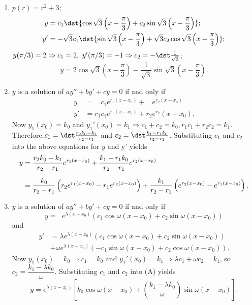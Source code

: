 \documentclass[openany]{book}
\newenvironment{sectionSolutions}{
 \begin{enumerate}[item-label={\thesection.\arabic{enumi}.}]
}{
 \end{enumerate}
}
\begin{document}
\begin{sectionSolutions}
\item
$p(r)=r^2+3$;
\begin{align*}
y&=c_1\dst{\cos \sqrt3\left(x-\frac{\pi}{3}\right)+c_2\sin
\sqrt3\left(x-\frac{\pi}{3}\right)};\\
y'&=-\sqrt3c_1\dst{\sin
\sqrt3\left(x-\frac{\pi}{3}\right)+\sqrt3c_2\cos
\sqrt3\left(x-\frac{\pi}{3}\right)};
\end{align*}
$y(\pi/3)=2\Rightarrow c_1=2,\ y'(\pi/3)=-1\Rightarrow
c_2=-\dst\frac{1}{\sqrt3}$;\;
\[
y=2\cos \sqrt3\left(x-\frac{\pi}{3}\right)-\frac{1}{\sqrt3}\sin
\sqrt3\left(x-\frac{\pi}{3}\right).
\]


\item
$y$ is a solution of $ay''+by'+cy=0$  if and only if
\begin{align*}
y&=\phantom{r_1}c_1e^{r_1(x-x_0)}+\phantom{r_2}e^{r_2(x-x_0)}\\
y'&=r_1c_1e^{r_1(x-x_0)}+r_2e^{r_2}(x-x_0).
\end{align*}
Now $y_1(x_0)=k_0$ and $y_1'(x_0)=k_1\Rightarrow c_1+c_2=k_0,
r_1c_1+r_2c_2=k_1$. Therefore,$c_1=\dst\frac{r_2k_0-k_1}{ r_2-r_1}$
and $c_2=\dst\frac{k_1-r_1k_0}{ r_2-r_1}$. Substituting $c_1$ and $c_2$
into  the above equations for $y$ and y' yields
\begin{align*}
y&=\frac{r_2k_0-k_1}{ r_2-r_1}e^{r_1(x-x_0)}+
\frac{k_1-r_1k_0}{ r_2-r_1}e^{r_2(x-x_0)}\\[2\jot]
&=\frac{k_0}{
r_2-r_1}\left(r_2e^{r_1(x-x_0)}-r_1e^{r_2(x-x_0)}\right)+\frac{k_1}{
r_2-r_1} \left(e^{r_2(x-x_0)}-e^{r_1(x-x_0)}\right).
\end{align*}



\item
\setcounter{equation}{0}
$y$ is a solution of $ay''+by'+cy=0$  if and only if
\[
y=\phantom{\lambda}e^{\lambda(x-x_0)}\left(c_1\cos\omega(x-x_0)+c_2\sin\omega(x-x_0)\right)
\tag{A}
\]
and
\begin{align*}
y'&=\lambda
e^{\lambda(x-x_0)}\left(c_1\cos\omega(x-x_0)+c_2\sin\omega(x-x_0)\right)\\
&
+\omega
e^{\lambda(x-x_0)}\left(-c_1\sin\omega(x-x_0)+c_2\cos\omega(x-x_0)\right).
\end{align*}
Now $y_1(x_0)=k_0\Rightarrow c_1=k_0$ and $y_1'(x_0)=k_1\Rightarrow
\lambda c_1+\omega c_2=k_1$,  so $c_2=\dfrac{k_1-\lambda
k_0}{\omega}$.
 Substituting $c_1$ and $c_2$
into
(A) yields
\[
y=e^{\lambda(x-x_0)}\left[k_0\cos\omega(x-x_0)+\left(\frac{k_1-\lambda k_0
}{\omega}\right)\sin\omega(x-x_0)\right].
\]


\end{sectionSolutions}
\end{document}
